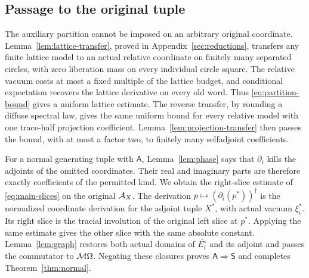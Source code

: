 \subsection{Passage to the original tuple}
The auxiliary partition cannot be imposed on an arbitrary original coordinate.
Lemma~\ref{lem:lattice-transfer}, proved in Appendix~\ref{sec:reductions}, transfers any finite lattice model to an actual relative coordinate on finitely many separated circles, with zero liberation mass on every individual circle square.
The relative vacuum costs at most a fixed multiple of the lattice budget, and conditional expectation recovers the lattice derivative on every old word.
Thus \eqref{eq:partition-bound} gives a uniform lattice estimate.
The reverse transfer, by rounding a diffuse spectral law, gives the same uniform bound for every relative model with one trace-half projection coefficient.
Lemma~\ref{lem:projection-transfer} then passes the bound, with at most a factor two, to finitely many selfadjoint coefficients.

For a normal generating tuple with $\mathsf A$, Lemma~\ref{lem:phase} says that $\partial_i$ kills the adjoints of the omitted coordinates.
Their real and imaginary parts are therefore exactly coefficients of the permitted kind.
We obtain the right-slice estimate of \eqref{eq:main-slices} on the original $\mathcal A_X$.
The derivation $p\mapsto(\partial_i(p^*))^\dagger$ is the normalized coordinate derivation for the adjoint tuple $X^*$, with actual vacuum $\xi_i^*$.
Its right slice is the tracial involution of the original left slice at $p^*$.
Applying the same estimate gives the other slice with the same absolute constant.
Lemma~\ref{lem:graph} restores both actual domains of $\overline{E_i^\circ}$ and its adjoint and passes the commutator to $\mathcal M\Omega$.
Negating these closures proves $\mathsf A\Rightarrow\mathsf S$ and completes Theorem~\ref{thm:normal}.
